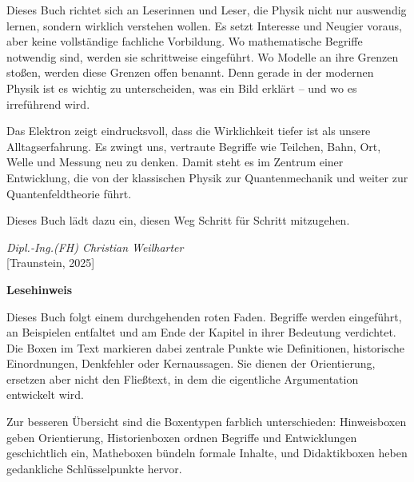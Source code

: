 Dieses Buch richtet sich an Leserinnen und Leser, die Physik nicht nur auswendig lernen, sondern wirklich verstehen wollen. 
Es setzt Interesse und Neugier voraus, aber keine vollständige fachliche Vorbildung. 
Wo mathematische Begriffe notwendig sind, werden sie schrittweise eingeführt. 
Wo Modelle an ihre Grenzen stoßen, werden diese Grenzen offen benannt. 
Denn gerade in der modernen Physik ist es wichtig zu unterscheiden, was ein Bild erklärt -- und wo es irreführend wird.

Das Elektron zeigt eindrucksvoll, dass die Wirklichkeit tiefer ist als unsere Alltagserfahrung. 
Es zwingt uns, vertraute Begriffe wie Teilchen, Bahn, Ort, Welle und Messung neu zu denken. 
Damit steht es im Zentrum einer Entwicklung, die von der klassischen Physik zur Quantenmechanik und weiter zur Quantenfeldtheorie führt.

Dieses Buch lädt dazu ein, diesen Weg Schritt für Schritt mitzugehen.








\begin{flushright}
	\textit{Dipl.-Ing.(FH) Christian Weilharter} \\
	\vspace{0.5em}
	[Traunstein, 2025]
\end{flushright}

\newpage
\noindent
\bigskip
\noindent
\textbf{Lesehinweis}

Dieses Buch folgt einem durchgehenden roten Faden.
Begriffe werden eingeführt,
an Beispielen entfaltet
und am Ende der Kapitel in ihrer Bedeutung verdichtet.
Die Boxen im Text markieren dabei zentrale Punkte
wie Definitionen, historische Einordnungen, Denkfehler oder Kernaussagen.
Sie dienen der Orientierung,
ersetzen aber nicht den Fließtext,
in dem die eigentliche Argumentation entwickelt wird.

\medskip
\noindent
Zur besseren Übersicht sind die Boxentypen farblich unterschieden:
Hinweisboxen geben Orientierung,
Historienboxen ordnen Begriffe und Entwicklungen geschichtlich ein,
Matheboxen bündeln formale Inhalte,
und Didaktikboxen heben gedankliche Schlüsselpunkte hervor.
